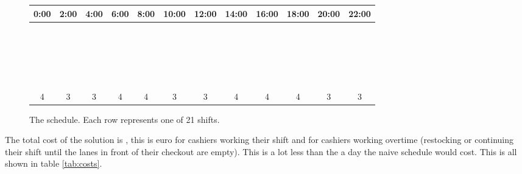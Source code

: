 \newcommand{\cc}{\cellcolor{cyan}}

\begin{figure}
	\centering

	\renewcommand{\arraystretch}{0.6} %
	
\begin{tabular}{|c|c|c|c|c|c|c|c|c|c|c|c|}
	\hline
	0:00 & 2:00 & 4:00 & 6:00 & 8:00 & 10:00 & 12:00 & 14:00 & 16:00 & 18:00 & 20:00 & 22:00  \\
	\hline
	\hline
	\cc & \cc & & & & & & & & & & \\ \hline 
	& \cc & \cc & & & & & & & & & \\ \hline
	& \cc & \cc & & & & & & & & & \\ \hline
	& & \cc & \cc & & & & & & & & \\ \hline
	& & & \cc & \cc & & & & & & & \\ \hline
	& & & \cc & \cc & & & & & & & \\ \hline
	& & & \cc & \cc & & & & & & & \\ \hline
	& & & & \cc & \cc & & & & & & \\ \hline
	& & & & & \cc & \cc & & & & & \\ \hline
	& & & & & \cc & \cc & & & & & \\ \hline
	& & & & & & \cc & \cc & & & & \\ \hline
	& & & & & & & \cc & \cc & & & \\ \hline
	& & & & & & & \cc & \cc & & & \\ \hline
	& & & & & & & \cc & \cc & & & \\ \hline
	& & & & & & & & \cc & \cc & & \\ \hline
	& & & & & & & & & \cc & \cc & \\ \hline
	& & & & & & & & & \cc & \cc & \\ \hline
	& & & & & & & & & \cc & \cc & \\ \hline
	\cc & & & & & & & & & & & \cc \\ \hline
	\cc & & & & & & & & & & & \cc \\ \hline
	\cc & & & & & & & & & & & \cc \\ 
	\hline
	\hline
	4 & 3 & 3 & 4 & 4 & 3 & 3 & 4 & 4 & 4 & 3 & 3\\
	\hline
\end{tabular}
\caption{The schedule. Each row represents one of 21 shifts.}
\label{fig:schedule}
\end{figure}

The total cost of the solution is , this is  euro for cashiers working their shift and  for cashiers working overtime (restocking or continuing their shift until the lanes in front of their checkout are empty). 
This is a lot less than the  a day the naive schedule would cost.
This is all shown in table \autoref{tab:costs}.

